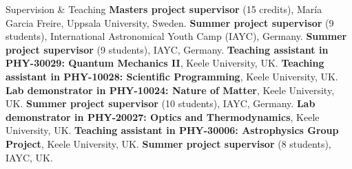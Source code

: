 \begin{rubric}{Supervision \& Teaching}
\entry*[2025 ~~~~~\,\,\,\,\,~~~~~]%
    \textbf{Masters project supervisor} (15 credits), María Garcia Freire, Uppsala University, Sweden.
\entry*[2024 ~~~~~\,\,\,\,\,~~~~~]%
    \textbf{Summer project supervisor} (9 students), International Astronomical Youth Camp (IAYC), Germany.
\entry*[2022 ~~~~~\,\,\,\,\,~~~~~]%
    \textbf{Summer project supervisor} (9 students), IAYC, Germany.
\entry*[2021 ~~~~~\,\,\,\,\,~~~~~]%
    \textbf{Teaching assistant in PHY-30029: Quantum Mechanics II}, Keele University, UK.
\entry*[2019 -- 2022]%
    \textbf{Teaching assistant in PHY-10028: Scientific Programming}, Keele University, UK.
\entry*[2019 -- 2021]%
    \textbf{Lab demonstrator in PHY-10024: Nature of Matter}, Keele University, UK.
\entry*[2019 ~~~~~\,\,\,\,\,~~~~~]%
    \textbf{Summer project supervisor} (10 students), IAYC, Germany.
\entry*[2018 -- 2021]%
    \textbf{Lab demonstrator in PHY-20027: Optics and Thermodynamics}, Keele University, UK.
\entry*[2018 ~~~~~\,\,\,\,\,~~~~~]%
    \textbf{Teaching assistant in PHY-30006: Astrophysics Group Project}, Keele University, UK.
\entry*[2018 ~~~~~\,\,\,\,\,~~~~~]%
    \textbf{Summer project supervisor} (8 students), IAYC, UK.
\end{rubric}